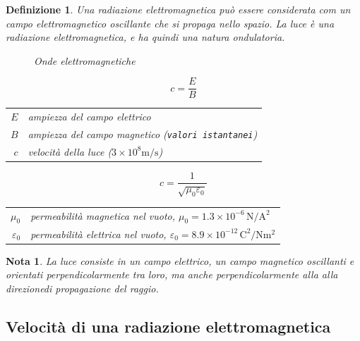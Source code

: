 \documentclass{book}
\newtheorem{defi}{Definizione}[section]
\newtheorem{nota}{Nota}[section]
\begin{document}
\begin{defi}
  Una radiazione elettromagnetica può essere considerata com un campo elettromagnetico oscillante che
  si propaga nello spazio. {\color{red}La luce è una radiazione elettromagnetica, e ha quindi una natura
    ondulatoria.}
\begin{figure}[th!]
    \centering
    
    \caption{Onde elettromagnetiche}
    \label{fig:ondelect}
\end{figure}
\begin{center}
  \begin{minipage}{.5\linewidth}
    \[
      c = \frac{E}{B}
    \]
    \begin{tabular}{r@{${}={}$}p{.8\linewidth}}
      $E$ & ampiezza del campo elettrico \\
      $B$ & ampiezza del campo magnetico (\texttt{valori istantanei}) \\
      $c$ & velocità della luce ($3\times10^8\mathrm{m/s}$) \\
    \end{tabular}
  \end{minipage}%
  \begin{minipage}{.5\linewidth}
    \[
      c = \frac{1}{\sqrt{\mu_0 \varepsilon_0}}
    \]
    \begin{tabular}{r@{${}={}$}p{.8\linewidth}}
      $\mu_0$ & permeabilità magnetica nel vuoto, $\mu_0 = 1.3\times10^{-6}\,\mathrm{N/A^2}$ \\
      $\varepsilon_0$ & permeabilità elettrica nel vuoto, $\varepsilon_0 = 8.9\times10^{-12}\,\mathrm{C^2/N m^2}$ \\
    \end{tabular}
  \end{minipage}
\end{center}
\end{defi}
\begin{nota}
  La luce consiste in un campo elettrico, un campo magnetico oscillanti e orientati perpendicolarmente
  tra loro, ma anche perpendicolarmente alla alla direzionedi propagazione del raggio.
\end{nota}

\subsection{Velocità di una radiazione elettromagnetica}
\label{sec:veldiunaradelect}
\end{document}
